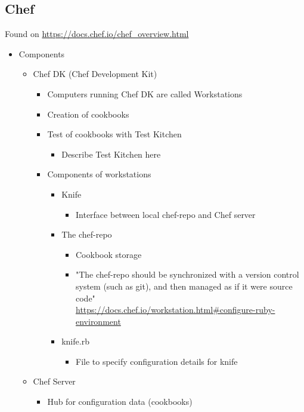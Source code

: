 \subsection{Chef}
	Found on \url{https://docs.chef.io/chef_overview.html}
	\begin{itemize}
		\item Components
			\begin{itemize}
				\item Chef DK (Chef Development Kit)
					\begin{itemize}
						\item Computers running Chef DK are called Workstations
						\item Creation of cookbooks
						\item Test of cookbooks with Test Kitchen
							\begin{itemize}
								\item Describe Test Kitchen here
							\end{itemize}
						\item Components of workstations
							\begin{itemize}
								\item Knife
									\begin{itemize}
										\item Interface between local chef-repo and Chef server
									\end{itemize}
								\item The chef-repo
									\begin{itemize}
										\item Cookbook storage
										\item "The chef-repo should be synchronized with a version control system (such as git), and then managed as if it were source code"\\ {\tiny \url{https://docs.chef.io/workstation.html#configure-ruby-environment}}
									\end{itemize}
								\item knife.rb
									\begin{itemize}
										\item File to specify configuration details for knife
									\end{itemize}
							\end{itemize}
					\end{itemize}
				\item Chef Server
					\begin{itemize}
						\item Hub for configuration data (cookbooks)

\end{itemize}
\end{itemize}
\end{itemize}
